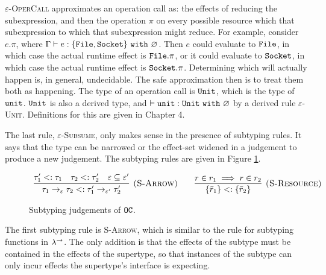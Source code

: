\textsc{$\varepsilon$-OperCall} approximates an operation call as: the effects of reducing the subexpression, and then the operation $\pi$ on every possible resource which that subexpression to which that subexpression might reduce. For example, consider $e.\pi$, where $\Gamma \vdash e: \{ \mathtt{File, Socket} \}~\mathtt{with}~ \varnothing$. Then $e$ could evaluate to $\mathtt{File}$, in which case the actual runtime effect is $\mathtt{File.\pi}$, or it could evaluate to $\mathtt{Socket}$, in which case the actual runtime effect is $\mathtt{Socket.\pi}$. Determining which will actually happen is, in general, undecidable. The safe approximation then is to treat them both as happening. The type of an operation call is $\mathtt{Unit}$, which is the type of $\mathtt{unit}$. $\mathtt{Unit}$ is also a derived type, and $\vdash \mathtt{unit}: \mathtt{Unit}~\mathtt{with}~ \varnothing$ by a derived rule \textsc{$\varepsilon$-Unit}. Definitions for this are given in Chapter 4.

The last rule, \textsc{$\varepsilon$-Subsume}, only makes sense in the presence of subtyping rules. It says that the type can be narrowed or the effect-set widened in a judgement to produce a new judgement. The subtyping rules are given in Figure \ref{fig:opercalc_static_rules}.


\begin{figure}[h]
\vspace{-5pt}


\[
\begin{array}{c}

\infer[\textsc{(S-Arrow)}]
	{ \tau_1 \rightarrow_{\varepsilon} \tau_2 <: \tau_1' \rightarrow_{\varepsilon'} \tau_2' }
	{ \tau_1' <: \tau_1 & \tau_2 <: \tau_2' & \varepsilon \subseteq \varepsilon' }
~~~~~~
\infer[\textsc{(S-Resource)}]
	{ \{ \bar r_1 \} <: \{ \bar r_2 \} }
	{ r \in r_1 \implies r \in r_2 }

\end{array}
\]

\vspace{-7pt}
\caption{Subtyping judgements of $\mathtt{OC}$.}
\label{fig:opercalc_static_rules}
\end{figure}

The first subtyping rule is \textsc{S-Arrow}, which is similar to the rule for subtyping functions in $\lambda^{\rightarrow}$. The only addition is that the effects of the subtype must be contained in the effects of the supertype, so that instances of the subtype can only incur effects the supertype's interface is expecting.

